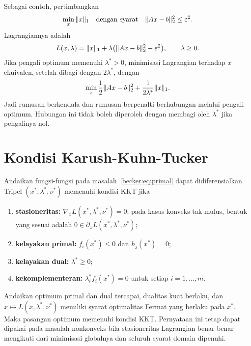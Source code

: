 Sebagai contoh, pertimbangkan
\begin{equation}
  \min_x\|x\|_1
  \quad\text{dengan syarat}\quad
  \|Ax-b\|_2^2\leq\varepsilon^2.
\end{equation}
Lagrangiannya adalah
\begin{equation}
  L(x,\lambda)=\|x\|_1
  +\lambda\bigl(\|Ax-b\|_2^2-\varepsilon^2\bigr),\qquad\lambda\geq0.
\end{equation}
Jika pengali optimum memenuhi $\lambda^*>0$, minimisasi Lagrangian terhadap
$x$ ekuivalen, setelah dibagi dengan $2\lambda^*$, dengan
\begin{equation}
  \min_x \frac12\|Ax-b\|_2^2
  +\frac{1}{2\lambda^*}\|x\|_1.
\end{equation}
Jadi rumusan berkendala dan rumusan berpenalti berhubungan melalui pengali
optimum. Hubungan ini tidak boleh diperoleh dengan membagi oleh $\lambda^*$
jika pengalinya nol.

\section{Kondisi Karush-Kuhn-Tucker}

Andaikan fungsi-fungsi pada masalah~\eqref{becker:eq:primal} dapat
didiferensialkan. Tripel $(x^*,\lambda^*,\nu^*)$ memenuhi kondisi KKT jika
\begin{enumerate}
  \item \textbf{stasioneritas:}
  $\nabla_xL(x^*,\lambda^*,\nu^*)=0$;
  pada kasus konveks tak mulus, bentuk yang sesuai adalah
  $0\in\partial_xL(x^*,\lambda^*,\nu^*)$;
  \item \textbf{kelayakan primal:}
  $f_i(x^*)\leq0$ dan $h_j(x^*)=0$;
  \item \textbf{kelayakan dual:} $\lambda^*\geq0$;
  \item \textbf{kekomplementeran:}
  $\lambda_i^*f_i(x^*)=0$ untuk setiap $i=1,\ldots,m$.
\end{enumerate}

\begin{theorem}
  Andaikan optimum primal dan dual tercapai, dualitas kuat berlaku, dan
  $x\mapsto L(x,\lambda^*,\nu^*)$ memiliki syarat optimalitas Fermat yang
  berlaku pada $x^*$. Maka pasangan optimum memenuhi kondisi KKT. Pernyataan
  ini tetap dapat dipakai pada masalah nonkonveks bila stasioneritas Lagrangian
  benar-benar mengikuti dari minimisasi globalnya dan seluruh syarat domain
  dipenuhi.
\end{theorem}

